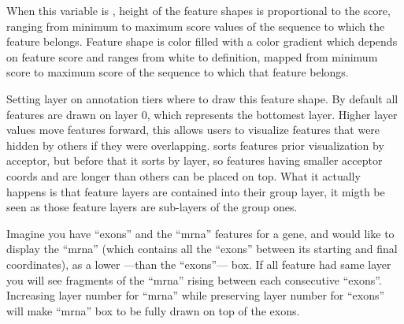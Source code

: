 %
%
%
%
   { {\tbdef} }
%
   { {\tbdef} }
%
   { {\tbdef} }
%
   { {\tbdef} }
%
   { {\tbdef} }
%
   { {\tbdef} }
%
   { {\tbdef} }
%
   { {\tbdef} }
%
   { {\tbdef} }
%
   { When this variable is , height of the feature shapes is proportional to the score, ranging from minimum to maximum score values of the sequence to which the feature belongs. }
%
   { Feature shape is color filled with a color gradient which depends on feature score and ranges from white to  definition, mapped from minimum score to maximum score of the sequence to which that feature belongs. }
%
   { {\tbdef} }
%
   { {\tbdef} }
%
   { Setting layer on annotation tiers where to draw this feature shape. By default all features are drawn on layer 0, which represents the bottomest layer. Higher layer values move features forward, this allows users to visualize features that were hidden by others if they were overlapping. {\prog} sorts features prior visualization by acceptor, but before that it sorts by layer, so features having smaller acceptor coords and are longer than others can be placed on top. What it actually happens is that feature layers are contained into their group layer, it migth be seen as those feature layers are sub-layers of the group ones. 
 
 Imagine you have ``exons'' and the ``mrna'' features for a gene, and would like to display the ``mrna'' (which contains all the ``exons'' between its starting and final coordinates), as a lower ---than the ``exons''--- box. If all feature had same layer you will see fragments of the ``mrna'' rising between each consecutive ``exons''. Increasing layer number for ``mrna'' while preserving layer number for ``exons'' will make ``mrna'' box to be fully drawn on top of the exons. }
%

